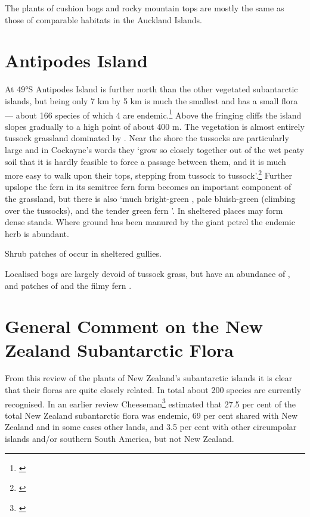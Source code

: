 The plants of cushion bogs and rocky mountain tops are mostly the same as those of comparable habitats in the Auckland Islands.

\section{Antipodes Island}

At 49°S Antipodes Island is further north than the other vegetated subantarctic islands, but being only 7 km by 5 km is much the smallest and has a small flora — about 166 species of which 4 are endemic.\footnote{\cite{williams1982species}}
Above the fringing cliffs the island slopes gradually to a high point of about 400 m.
The vegetation is almost entirely tussock grassland dominated by .
Near the shore the tussocks are particularly large and in Cockayne's words they `grow so closely together out of the wet peaty soil that it is hardly feasible to force a passage between them, and it is much more easy to walk upon their tops, stepping from tussock to tussock'.\footnote{\cite{cockayne1909ecological}}
Further upslope the fern  in its semitree fern form becomes an important component of the grassland, but there is also `much bright-green , pale bluish-green  (climbing over the tussocks), and the tender green fern '.
In sheltered places  may form dense stands.
Where ground has been manured by the giant petrel the endemic herb  is abundant.

Shrub patches of  occur in sheltered gullies.

Localised bogs are largely devoid of tussock grass, but have an abundance of ,  and patches of  and the filmy fern .

\section{General Comment on the New Zealand Subantarctic Flora}

From this review of the plants of New Zealand's subantarctic islands it is clear that their floras are quite closely related.
In total about 200 species are currently recognised.
In an earlier review Cheeseman\footnote{\cite{cheeseman1909systematic}} estimated that 27.5 per cent of the total New Zealand subantarctic flora was endemic, 69 per cent shared with New Zealand and in some cases other lands, and 3.5 per cent with other circumpolar islands and/or southern South America, but not New Zealand.

